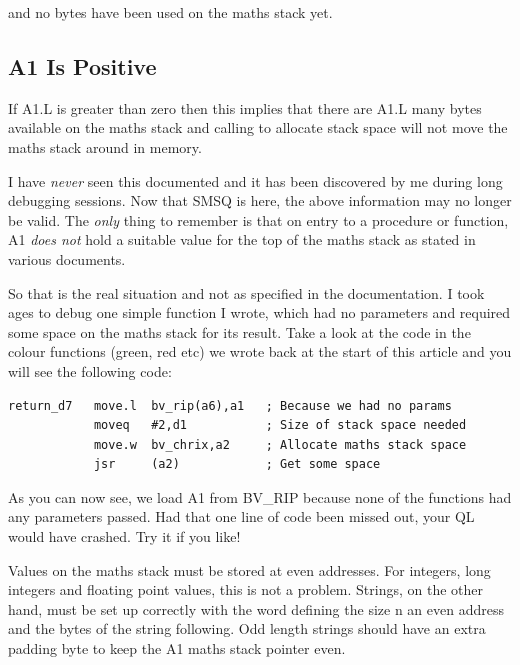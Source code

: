 and no bytes have been used on the maths stack yet.

\subsection{A1 Is Positive}
\label{ch7-A1-positive}%

If A1.L is greater than zero then this implies that there are A1.L
      many bytes available on the maths stack and calling  to allocate
      stack space will not move the maths stack around in memory.

\begin{warning}
I have \emph{never} seen this documented and it
        has been discovered by me during long debugging sessions. Now that
        SMSQ is here, the above information may no longer be valid. The
 \emph{only} thing to remember is that on entry to a
        procedure or function, A1 \emph{does not} hold a
        suitable value for the top of the maths stack as stated in various
        documents.
\end{warning}

So that is the real situation and not as specified in the
      documentation. I took ages to debug one simple function I wrote, which
      had no parameters and required some space on the maths stack for its
      result. Take a look at the code in the colour functions (green, red etc)
      we wrote back at the start of this article and you will see the
      following code:

\begin{lstlisting}[firstnumber=1,]
return_d7   move.l  bv_rip(a6),a1   ; Because we had no params
            moveq   #2,d1           ; Size of stack space needed
            move.w  bv_chrix,a2     ; Allocate maths stack space
            jsr     (a2)            ; Get some space
\end{lstlisting}

As you can now see, we load A1 from BV\_RIP because none of the
      functions had any parameters passed. Had that one line of code been
      missed out, your QL would have crashed. Try it if you like!

Values on the maths stack must be stored at even addresses. For
      integers, long integers and floating point values, this is not a
      problem. Strings, on the other hand, must be set up correctly with the
      word defining the size n an even address and the bytes of the string
      following. Odd length strings should have an extra padding byte to keep
      the A1 maths stack pointer even.

